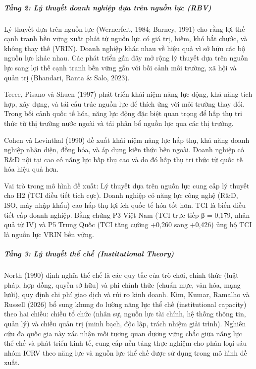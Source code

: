 \documentclass[
  a4paper,
  13pt]{extreport}
\begin{document}
\hypertarget{tux1ea7ng-2-luxfd-thuyux1ebft-doanh-nghiux1ec7p-dux1ef1a-truxean-nguux1ed3n-lux1ef1c-rbv}{%
\subparagraph{Tầng 2: Lý thuyết doanh nghiệp dựa trên nguồn lực
(RBV)}\label{tux1ea7ng-2-luxfd-thuyux1ebft-doanh-nghiux1ec7p-dux1ef1a-truxean-nguux1ed3n-lux1ef1c-rbv}}

Lý thuyết dựa trên nguồn lực (Wernerfelt, 1984; Barney, 1991) cho rằng
lợi thế cạnh tranh bền vững xuất phát từ nguồn lực có giá trị, hiếm, khó
bắt chước, và không thay thế (VRIN). Doanh nghiệp khác nhau về hiệu quả
vì sở hữu các bộ nguồn lực khác nhau. Các phát triển gần đây mở rộng lý
thuyết dựa trên nguồn lực sang lợi thế cạnh tranh bền vững gắn với bối
cảnh môi trường, xã hội và quản trị (Bhandari, Ranta \& Salo, 2023).

Teece, Pisano và Shuen (1997) phát triển khái niệm năng lực động, khả
năng tích hợp, xây dựng, và tái cấu trúc nguồn lực để thích ứng với môi
trường thay đổi. Trong bối cảnh quốc tế hóa, năng lực động đặc biệt quan
trọng để hấp thụ tri thức từ thị trường nước ngoài và tái phân bổ nguồn
lực qua các thị trường.

Cohen và Levinthal (1990) đề xuất khái niệm năng lực hấp thụ, khả năng
doanh nghiệp nhận diện, đồng hóa, và áp dụng kiến thức bên ngoài. Doanh
nghiệp có R\&D nội tại cao có năng lực hấp thụ cao và do đó hấp thụ tri
thức từ quốc tế hóa hiệu quả hơn.

Vai trò trong mô hình đề xuất: Lý thuyết dựa trên nguồn lực cung cấp lý
thuyết cho H2 (TCI điều tiết tích cực). Doanh nghiệp có năng lực công
nghệ (R\&D, ISO, máy nhập khẩu) cao hấp thụ lợi ích quốc tế hóa tốt hơn.
TCI là biến điều tiết cấp doanh nghiệp. Bằng chứng P3 Việt Nam (TCI trực
tiếp β = 0,179, nhân quả từ IV) và P5 Trung Quốc (TCI tăng cường +0,260
sang +0,426) ủng hộ TCI là nguồn lực VRIN bền vững.

\hypertarget{tux1ea7ng-3-luxfd-thuyux1ebft-thux1ec3-chux1ebf-institutional-theory}{%
\subparagraph{Tầng 3: Lý thuyết thể chế (Institutional
Theory)}\label{tux1ea7ng-3-luxfd-thuyux1ebft-thux1ec3-chux1ebf-institutional-theory}}

North (1990) định nghĩa thể chế là các quy tắc của trò chơi, chính thức
(luật pháp, hợp đồng, quyền sở hữu) và phi chính thức (chuẩn mực, văn
hóa, mạng lưới), quy định chi phí giao dịch và rủi ro kinh doanh. Kim,
Kumar, Ramalho và Russell (2026) bổ sung khung đo lường năng lực thể chế
(institutional capacity) theo hai chiều: chiều tổ chức (nhân sự, nguồn
lực tài chính, hệ thống thông tin, quản lý) và chiều quản trị (minh
bạch, độc lập, trách nhiệm giải trình). Nghiên cứu đa quốc gia này xác
nhận mối tương quan dương vững chắc giữa năng lực thể chế và phát triển
kinh tế, cung cấp nền tảng thực nghiệm cho phân loại sáu nhóm ICRV theo
năng lực và nguồn lực thể chế được sử dụng trong mô hình đề xuất.
\end{document}
